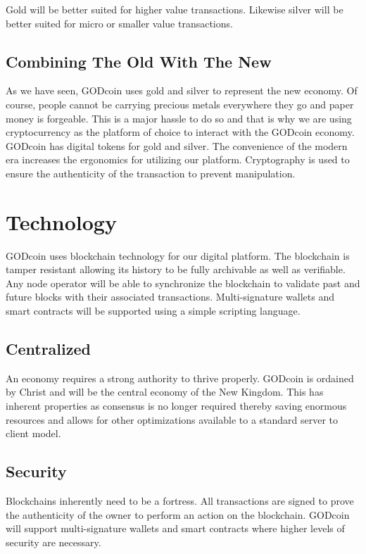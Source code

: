 \documentclass[12pt,a4paper]{article}
\begin{document}
  Gold will be better suited for higher value transactions. Likewise silver will
  be better suited for micro or smaller value transactions.

  \subsection{Combining The Old With The New}
  As we have seen, GODcoin uses gold and silver to represent the new economy. Of
  course, people cannot be carrying precious metals everywhere they go and paper
  money is forgeable. This is a major hassle to do so and that is why we are
  using cryptocurrency as the platform of choice to interact with the GODcoin
  economy.\\

  GODcoin has digital tokens for gold and silver. The convenience of the modern
  era increases the ergonomics for utilizing our platform. Cryptography is used
  to ensure the authenticity of the transaction to prevent manipulation.

  \section{Technology}
  GODcoin uses blockchain technology for our digital platform. The blockchain is
  tamper resistant allowing its history to be fully archivable as well as
  verifiable. Any node operator will be able to synchronize the blockchain to
  validate past and future blocks with their associated transactions.
  Multi-signature wallets and smart contracts will be supported using a simple
  scripting language.\\

  \subsection{Centralized}
  An economy requires a strong authority to thrive properly. GODcoin is ordained
  by Christ and will be the central economy of the New Kingdom. This has
  inherent properties as consensus is no longer required thereby saving enormous
  resources and allows for other optimizations available to a standard server to
  client model.

  \subsection{Security}
  Blockchains inherently need to be a fortress. All transactions are signed to
  prove the authenticity of the owner to perform an action on the blockchain.
  GODcoin will support multi-signature wallets and smart contracts where higher
  levels of security are necessary.\\
\end{document}
